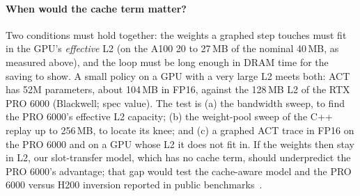 \documentclass[10pt,twocolumn]{article}
\begin{document}
\paragraph{When would the cache term matter?} Two conditions must hold together: the weights a
graphed step touches must fit in the GPU's \emph{effective} L2 (on the A100 20 to 27\,MB of
the nominal 40\,MB, as measured above), and the loop must be long enough in DRAM time for the
saving to show. A small policy on a GPU with a very large L2 meets both: ACT has 52M parameters,
about 104\,MB in FP16, against the 128\,MB L2 of the RTX PRO 6000 (Blackwell; spec value). The
test is (a) the bandwidth sweep, to find the PRO 6000's effective L2 capacity; (b) the
weight-pool sweep of the C++ replay up to 256\,MB, to locate its knee; and (c) a graphed ACT
trace in FP16 on the PRO 6000 and on a GPU whose L2 it does not fit in. If the weights then stay
in L2, our slot-transfer model, which has no cache term, should underpredict the PRO 6000's
advantage; that gap would test the cache-aware model and the PRO 6000 versus H200 inversion
reported in public benchmarks~\cite{yotta}.
\end{document}
